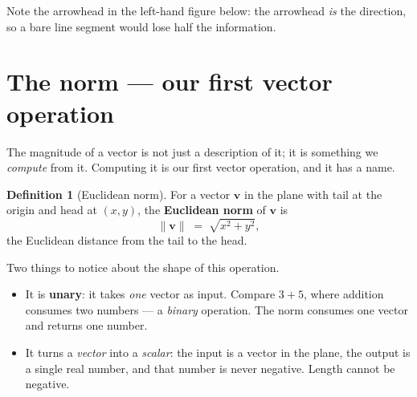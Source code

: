 \documentclass[11pt]{article}
\theoremstyle{definition}
\newtheorem{defn}{Definition}
\theoremstyle{remark}
\newcommand{\vc}[1]{\mathbf{#1}}
\newcommand{\norm}[1]{\lVert #1\rVert}
\newcommand{\lattice}[4]{%
  \draw[step=1cm,gray!25,very thin] (#1,#3) grid (#2,#4);
  \draw[axisline] (#1,0) -- (#2+0.45,0) node[right,font=\scriptsize,black]{$x$};
  \draw[axisline] (0,#3) -- (0,#4+0.45) node[above,font=\scriptsize,black]{$y$};
}
\begin{document}
\noindent Note the arrowhead in the left-hand figure below: the arrowhead
\emph{is} the direction, so a bare line segment would lose half the
information.

\begin{center}
\hspace{1.4cm}
\end{center}

\section{The norm --- our first vector operation}
The magnitude of a vector is not just a description of it; it is something we
\emph{compute} from it. Computing it is our first vector operation, and it has a
name.

\begin{defn}[Euclidean norm]
For a vector $\vc{v}$ in the plane with tail at the origin and head at $(x,y)$,
the \textbf{Euclidean norm} of $\vc{v}$ is
\[
  \norm{\vc{v}} \;=\; \sqrt{x^{2}+y^{2}},
\]
the Euclidean distance from the tail to the head.
\end{defn}

Two things to notice about the shape of this operation.

\begin{itemize}[leftmargin=1.4em,itemsep=3pt]
  \item It is \textbf{unary}: it takes \emph{one} vector as input. Compare $3+5$,
        where addition consumes two numbers --- a \emph{binary} operation. The
        norm consumes one vector and returns one number.
  \item It turns a \emph{vector} into a \emph{scalar}: the input is a vector in
        the plane, the output is a single real number, and that number is never
        negative. Length cannot be negative.
\end{itemize}
\end{document}
